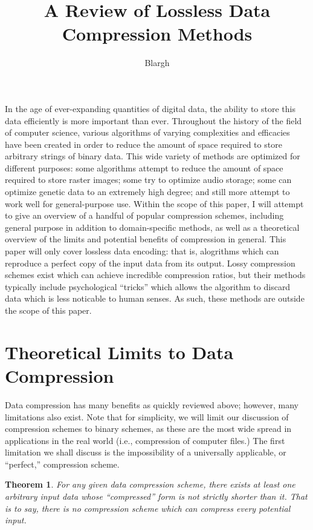 \documentclass[12pt]{article}
\title{A Review of Lossless Data Compression Methods}
\author{Blargh}
\newtheorem{thm}{Theorem}[section]
\begin{document}
\maketitle

In the age of ever-expanding quantities of digital data, the ability
to store this data efficiently is more important than ever. Throughout
the history of the field of computer science, various algorithms of
varying complexities and efficacies have been created in order to
reduce the amount of space required to store arbitrary strings of
binary data. This wide variety of methods are optimized for different
purposes: some algorithms attempt to reduce the amount of space
required to store raster images; some try to optimize audio storage;
some can optimize genetic data to an extremely high degree; and still
more attempt to work well for general-purpose use. Within the scope of
this paper, I will attempt to give an overview of a handful of popular
compression schemes, including general purpose in addition to
domain-specific methods, as well as a theoretical overview of the
limits and potential benefits of compression in general. This paper
will only cover lossless data encoding: that is, alogrithms which can
reproduce a perfect copy of the input data from its output. Lossy
compression schemes exist which can achieve incredible compression
ratios, but their methods typically include psychological ``tricks''
which allows the algorithm to discard data which is less noticable to
human senses. As such, these methods are outside the scope of this
paper.

\section{Theoretical Limits to Data Compression}

Data compression has many benefits as quickly reviewed above; however,
many limitations also exist. Note that for simplicity, we will limit
our discussion of compression schemes to binary schemes, as these are
the most wide spread in applications in the real world (i.e.,
compression of computer files.) The first limitation we shall discuss
is the impossibility of a universally applicable, or ``perfect,''
compression scheme.

\begin{thm}
  For any given data compression scheme, there exists at least one
  arbitrary input data whose ``compressed'' form is not strictly
  shorter than it. That is to say, there is no compression scheme
  which can compress every potential input.
\end{thm}
\end{document}
